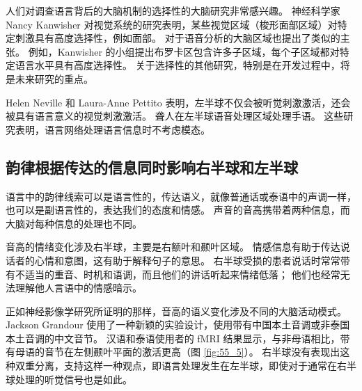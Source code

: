 人们对调查语言背后的大脑机制的选择性的大脑研究非常感兴趣。 神经科学家 Nancy Kanwisher 对视觉系统的研究表明，某些视觉区域（梭形面部区域）对特定刺激具有高度选择性，例如面部。 对于语音分析的大脑区域也提出了类似的主张。 例如，Kanwisher 的小组提出布罗卡区包含许多子区域，每个子区域都对特定语言水平具有高度选择性。 关于选择性的其他研究，特别是在开发过程中，将是未来研究的重点。

Helen Neville 和 Laura-Anne Pettito 表明，左半球不仅会被听觉刺激激活，还会被具有语言意义的视觉刺激激活。 聋人在左半球语音处理区域处理手语。 这些研究表明，语言网络处理语言信息时不考虑模态。

\subsection{韵律根据传达的信息同时影响右半球和左半球}
语言中的韵律线索可以是语言性的，传达语义，就像普通话或泰语中的声调一样，也可以是副语言性的，表达我们的态度和情感。 声音的音高携带着两种信息，而大脑对每种信息的处理也不同。

音高的情绪变化涉及右半球，主要是右额叶和颞叶区域。 情感信息有助于传达说话者的心情和意图，这有助于解释句子的意思。 右半球受损的患者说话时常常带有不适当的重音、时机和语调，而且他们的讲话听起来情绪低落； 他们也经常无法理解他人言语中的情感暗示。

正如神经影像学研究所证明的那样，音高的语义变化涉及不同的大脑活动模式。 Jackson Grandour 使用了一种新颖的实验设计，使用带有中国本土音调或非泰国本土音调的中文音节。 汉语和泰语使用者的 fMRI 结果显示，与非母语相比，带有母语的音节在左侧颞叶平面的激活更高（图 \ref{fig:55_5}）。 右半球没有表现出这种双重分离，支持这样一种观点，即语言处理发生在左半球，即使对于通常在右半球处理的听觉信号也是如此。

